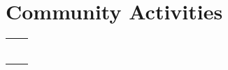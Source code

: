 \documentclass[a4paper, 10pt]{article}
\newcommand{\ExternalLink}{%
	\tikz[x=1.2ex, y=1.2ex, baseline=-0.05ex]{%
		\begin{scope}[x=1ex, y=1ex]
			\clip (-0.1,-0.1) 
			--++ (-0, 1.2) 
			--++ (0.6, 0) 
			--++ (0, -0.6) 
			--++ (0.6, 0) 
			--++ (0, -1);
			\path[draw, 
			line width = 0.5, 
			rounded corners=0.5] 
			(0,0) rectangle (1,1);
		\end{scope}
		\path[draw, line width = 0.5] (0.5, 0.5) 
		-- (1, 1);
		\path[draw, line width = 0.5] (0.6, 1) 
		-- (1, 1) -- (1, 0.6);
	}
}
\begin{document}
\begin{center}
\begin{table}[H]
\begin{adjustwidth}{-.6mm}{-0.5cm}
\begin{tabular}
\begin{comment}
			\multicolumn{2}{L{536pt}}{{{Chaired the meetup with Prof. Bryan Ford \textsuperscript{\href{https://bford.info/}{\ExternalLink}}, leader of  EPFL Decentralized/Distributed Systems lab \hfill {\space\faMapMarker} \small{Geneva}, 2017}}}\\
\end{comment}
			
		\end{tabular}
	\end{adjustwidth}
\end{table}

\vspace{-6ex}
\begin{minipage}[t]{0.48\textwidth}
	

	\vspace{-4ex}
	\section{Community Activities}
		\vspace{-4ex}
	\begin{tabularx}{1\linewidth}{>{\raggedleft\scshape}p{3cm}X}
			\multicolumn{2}{L{250pt}}{{{2015 - Present : Geneva Debate Club \textsuperscript{\href{https://www.clubdedebat.ch/}{\ExternalLink}}}}}\\
			\multicolumn{2}{L{250pt}}{{{2018 - Present : CERN Entrepreneurship Meetups \textsuperscript{\href{https://www.clubdedebat.ch/}{\ExternalLink}}}}}\\
			\multicolumn{2}{L{250pt}}{{{2016 - 2018 \hspace{12pt}: Swiss Cyber-Security meetup \textsuperscript{\href{https://swiss-cybersecurity.ch/}{\ExternalLink}}}}}\\ \\
			\multicolumn{2}{L{259pt}}{{{{{\textbf{Operating Systems:}}} {Debian GNU/Linux, Windows, macOS} \hspace{2cm} \uline {} \textsuperscript{}}}}\\
			\multicolumn{2}{L{536pt}}{{{{\large\textbf{\uuline{\textbf{References}:}}} Prof. John Ellis \textsuperscript{\href{https://en.wikipedia.org/wiki/John_Ellis_(physicist)}{\ExternalLink}}, Dr. Markus Nordberg \textsuperscript{\href{https://nordberg.web.cern.ch/}{\ExternalLink}}, Dr. Fran\c{c}ois Grey \textsuperscript{\href{https://en.wikipedia.org/wiki/John_Ellis_(physicist)}{\ExternalLink}}, Dr. Ben Segal \textsuperscript{\href{https://internethalloffame.org/inductees/ben-segal}{\ExternalLink}}
			
}}}
\end{tabularx}
\end{minipage}
\end{center}
\end{document}
